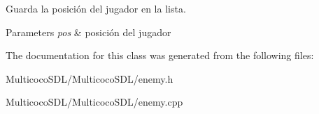 Guarda la posición del jugador en la lista. 


\begin{DoxyParams}{Parameters}
{\em pos} & posición del jugador \\
\hline
\end{DoxyParams}


The documentation for this class was generated from the following files\-:\begin{DoxyCompactItemize}
\item 
Multicoco\-S\-D\-L/\-Multicoco\-S\-D\-L/enemy.\-h\item 
Multicoco\-S\-D\-L/\-Multicoco\-S\-D\-L/enemy.\-cpp\end{DoxyCompactItemize}
